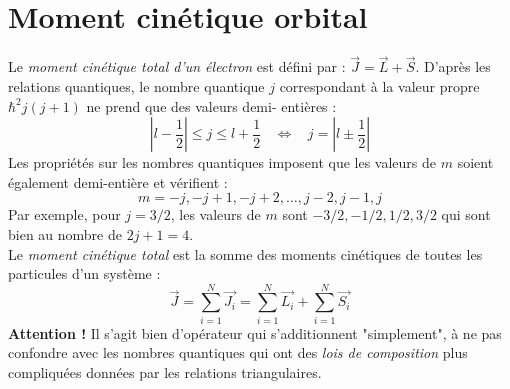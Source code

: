 \documentclass	[11pt, a4paper, openany]{book}
\begin{document}
		
	\section{Moment cinétique orbital}
	Le \textit{moment cinétique total d'un électron} est défini par : $\vec{J} = 
	\vec{L}+\vec{S}$. D'après les relations quantiques, le nombre quantique $j$ 
	correspondant à la valeur propre $\hbar^2j(j+1)$ ne prend que des valeurs demi-
	entières :
	\begin{equation}
		\left|l-\frac{1}{2}\right| \leq j \leq l+\frac{1}{2}\ \ \ \ \Leftrightarrow\ \ \ \
		j = \left|l\pm\frac{1}{2}\right|
	\end{equation}
	Les propriétés sur les nombres quantiques imposent que les valeurs de $m$ soient
	également demi-entière et vérifient :
	\begin{equation}
		m = -j, -j+1, -j+2, \dots, j-2,j-1,j
	\end{equation}
	Par exemple, pour $j=3/2$, les valeurs de $m$ sont $-3/2,-1/2,1/2,3/2$ qui sont 
	bien au nombre de $2j+1=4$.\\
		
	Le \textit{moment cinétique total} est la somme des moments cinétiques de toutes 
	les particules d'un système :
	\begin{equation}
		\vec{J} = \sum_{i=1}^N\vec{J_i} = \sum_{i=1}^N \vec{L_i} + \sum_{i=1}^N \vec{S_i}
	\end{equation}
	\textbf{Attention !} Il s'agit bien d'opérateur qui s'additionnent "simplement", à 
	ne pas confondre avec les nombres quantiques qui ont des \textit{lois de composition} 
	plus compliquées données par les relations triangulaires.
		
		
\end{document}
